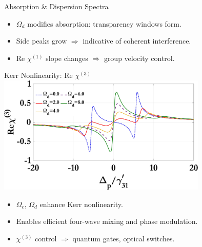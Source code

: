 \documentclass[12pt,aspectratio=1610]{beamer}
\begin{document}
\begin{frame}{Absorption \& Dispersion Spectra}
\begin{figure}[h]
\begin{minipage}{0.48\textwidth}
      \subcaption{}
    \end{minipage}\label{fig:chi1_d}
   \end{figure}
   \begin{itemize}
    \item $\Omega_d$ modifies absorption: transparency windows form.
    \item Side peaks grow $\Rightarrow$ indicative of coherent interference.
    \item Re $\chi^{(1)}$ slope changes $\Rightarrow$ group velocity control.
  \end{itemize}
\end{frame}

\begin{frame}{Kerr Nonlinearity: Re $\chi^{(3)}$}
  \vspace{-4pt}
  \hspace*{36pt}
  \includegraphics[width=0.75\textwidth]{Assets/Real_chi3_Omega_d.jpeg}
  \begin{itemize}
    \item $\Omega_c$, $\Omega_d$ enhance Kerr nonlinearity.
    \item Enables efficient four-wave mixing and phase modulation.
    \item $\chi^{(3)}$ control $\Rightarrow$ quantum gates, optical switches.
  \end{itemize}
\end{frame}
\end{document}
